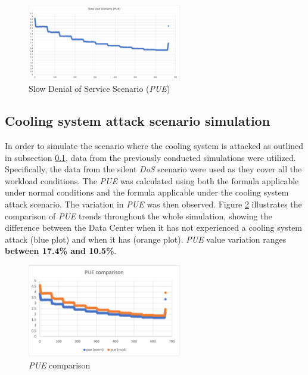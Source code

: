 \begin{figure}[h]
    \centering
    \includegraphics[width=0.6\textwidth]{chapters/images/slow_dos_pue.png}
    \caption{Slow Denial of Service Scenario (\emph{PUE})}
    \label{fig:slow_dos_pue}
\end{figure}

\subsection{Cooling system attack scenario simulation} \label{subsection:coolingsystemattack}
In order to simulate the scenario where the cooling system is attacked as outlined in subsection \ref{subsection:coolingsystemattack}, data from the previously conducted simulations were utilized. Specifically, the data from the silent \emph{DoS} scenario were used as they cover all the workload conditions. The \emph{PUE} was calculated using both the formula applicable under normal conditions and the formula applicable under the cooling system attack scenario. The variation in \emph{PUE} was then observed. Figure \ref{fig:pue_comp} illustrates the comparison of \emph{PUE} trends throughout the whole simulation, showing the difference between the Data Center when it has not experienced a cooling system attack (blue plot) and when it has (orange plot). \emph{PUE} value variation ranges \textbf{between 17.4\% and 10.5\%}.
\begin{figure}[h]
    \centering
    \includegraphics[width=0.6\textwidth]{chapters/images/pue_comp.png}
    \caption{\emph{PUE} comparison}
    \label{fig:pue_comp}
\end{figure}



